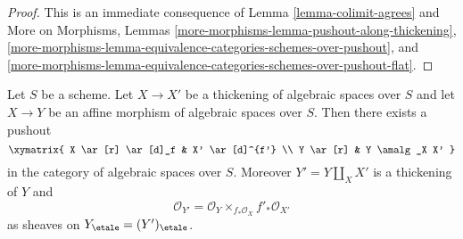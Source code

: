 \begin{proof}
This is an immediate consequence of Lemma \ref{lemma-colimit-agrees} and
More on Morphisms, Lemmas
\ref{more-morphisms-lemma-pushout-along-thickening},
\ref{more-morphisms-lemma-equivalence-categories-schemes-over-pushout}, and
\ref{more-morphisms-lemma-equivalence-categories-schemes-over-pushout-flat}.
\end{proof}

\begin{lemma}
\label{lemma-pushout-along-thickening}
Let $S$ be a scheme. Let $X \to X'$ be a thickening of algebraic spaces
over $S$ and let $X \to Y$ be an affine morphism of algebraic spaces over $S$.
Then there exists a pushout
$$
\xymatrix{
X \ar[r] \ar[d]_f
&
X' \ar[d]^{f'}
\\
Y \ar[r]
&
Y \amalg_X X'
}
$$
in the category of algebraic spaces over $S$. Moreover $Y' = Y \amalg_X X'$
is a thickening of $Y$ and
$$
\mathcal{O}_{Y'} = \mathcal{O}_Y \times_{f_*\mathcal{O}_X} f'_*\mathcal{O}_{X'}
$$
as sheaves on $Y_\etale = (Y')_\etale$.
\end{lemma}

